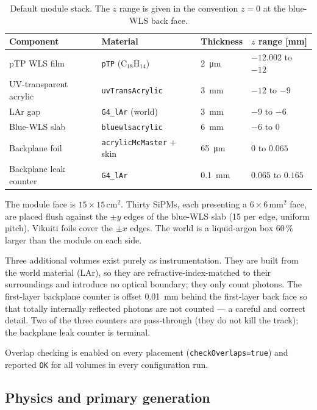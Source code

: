 \documentclass[a4paper,11pt]{article}
\begin{document}
\begin{table}[htbp]
\centering
\caption{\label{tab:geom}Default module stack. The $z$ range is given in the
convention $z=0$ at the blue-WLS back face.}
\begin{tabular}{llll}
\toprule
Component & Material & Thickness & $z$ range [mm] \\
\midrule
pTP WLS film            & \texttt{pTP} (C$_{18}$H$_{14}$)     & \SI{2}{\micro\meter} & $-12.002$ to $-12$ \\
UV-transparent acrylic  & \texttt{uvTransAcrylic}             & \SI{3}{\milli\meter} & $-12$ to $-9$ \\
LAr gap                 & \texttt{G4\_lAr} (world)            & \SI{3}{\milli\meter} & $-9$ to $-6$ \\
Blue-WLS slab           & \texttt{bluewlsacrylic}             & \SI{6}{\milli\meter} & $-6$ to $0$ \\
Backplane foil          & \texttt{acrylicMcMaster} + skin     & \SI{65}{\micro\meter} & $0$ to $0.065$ \\
Backplane leak counter  & \texttt{G4\_lAr}                    & \SI{0.1}{\milli\meter} & $0.065$ to $0.165$ \\
\bottomrule
\end{tabular}
\end{table}

The module face is $15\times15$\,cm$^2$. Thirty SiPMs, each presenting a
$6\times6$\,mm$^2$ face, are placed flush against the $\pm y$ edges of the
blue-WLS slab (15 per edge, uniform pitch). Vikuiti foils cover the $\pm x$
edges. The world is a liquid-argon box 60\,\% larger than the module on each
side.

Three additional volumes exist purely as instrumentation. They are built from
the world material (LAr), so they are refractive-index-matched to their
surroundings and introduce no optical boundary; they only count photons. The
first-layer backplane counter is offset \SI{0.01}{\milli\meter} behind the
first-layer back face so that totally internally reflected photons are not
counted --- a careful and correct detail. Two of the three counters are
pass-through (they do not kill the track); the backplane leak counter is
terminal.

Overlap checking is enabled on every placement (\texttt{checkOverlaps=true}) and
reported \texttt{OK} for all volumes in every configuration run.

\subsection{Physics and primary generation}
\end{document}
